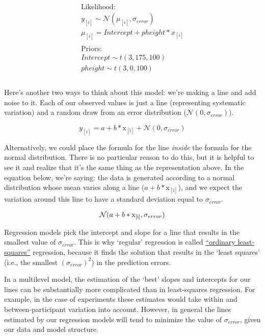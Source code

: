 \documentclass[
]{book}
\begin{document}
\begin{equation}
\begin{split}
\\
\textrm{Likelihood:} \\
y_{[i]} \sim \mathcal{N}(\mu_{[i]},\sigma_{error}) \\
\mu_{[i]} = Intercept + pheight * x_{[i]}  \\ \\
\textrm{Priors:} \\
Intercept \sim t(3, 175, 100) \\
pheight \sim t(3, 0, 100) \\
\\
\end{split}
\label{eq:57}
\end{equation}

Here's another two ways to think about this model: we're making a line and add noise to it. Each of our observed values is just a line (representing systematic variation) and a random draw from an error distribution (\(\mathcal{N}(0,\sigma_{error})\)).

\[
y_{[i]} = a + b * \mathrm{x_{[i]}} + \mathcal{N}(0,\sigma_{error})
\label{eq:58}
\]

Alternatively, we could place the formula for the line \emph{inside} the formula for the normal distribution. There is no particular reason to do this, but it is helpful to see it and realize that it's the same thing as the representation above. In the equation below, we're saying: the data is generated according to a normal distribution whose mean varies along a line (\(a + b * \mathrm{x_{[i]}}\)), and we expect the variation around this line to have a standard deviation equal to \(\sigma_{error}\).

\[
\mathcal{N}(a + b * \mathrm{x_{[i]}}, \sigma_{error})  \\
\label{eq:59}
\]

Regression models pick the intercept and slope for a line that results in the smallest value of \(\sigma_{error}\). This is why `regular' regression is called \href{https://en.wikipedia.org/wiki/Ordinary_least_squares}{``ordinary least-squares''} regression, because it finds the solution that results in the `least squares' (i.e., the smallest \((\sigma_{error})^2\)) in the prediction errors.

In a multilevel model, the estimation of the `best' slopes and intercepts for our lines can be substantially more complicated than in least-squares regression. For example, in the case of experiments these estimates would take within and between-participant variation into account. However, in general the lines estimated by our regression models will tend to minimize the value of \(\sigma_{error}\), given our data and model structure.
\end{document}
